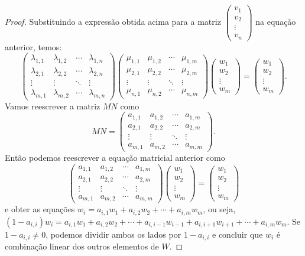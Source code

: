 \begin{proof}
	Substituindo a expressão obtida acima para a matriz $\begin{pmatrix}
	v_1\\v_2\\\vdots\\v_n
	\end{pmatrix}$ na equação anterior, temos:
	\[\begin{pmatrix}
	\lambda_{1,1}&\lambda_{1,2}&\cdots&\lambda_{1,n}\\
	\lambda_{2,1}&\lambda_{2,2}&\cdots&\lambda_{2,n}\\
	\vdots&\vdots&\ddots&\vdots\\
	\lambda_{m,1}&\lambda_{m,2}&\cdots&\lambda_{m,n}
	\end{pmatrix}\begin{pmatrix}
	\mu_{1,1}&\mu_{1,2}&\cdots&\mu_{1,m}\\
	\mu_{2,1}&\mu_{2,2}&\cdots&\mu_{2,m}\\
	\vdots&\vdots&\ddots&\vdots\\
	\mu_{n,1}&\mu_{n,2}&\cdots&\mu_{n,m}
	\end{pmatrix}\begin{pmatrix}
	w_1\\w_2\\\vdots\\w_m
	\end{pmatrix}=\begin{pmatrix}
	w_1\\w_2\\\vdots\\w_m
	\end{pmatrix}.\] Vamos reescrever a matriz $MN$ como
	\[MN=\begin{pmatrix}
	a_{1,1}&a_{1,2}&\cdots&a_{1,m}\\
	a_{2,1}&a_{2,2}&\cdots&a_{2,m}\\
	\vdots&\vdots&\ddots&\vdots\\
	a_{m,1}&a_{m,2}&\cdots&a_{m,m}
	\end{pmatrix}.\] Então podemos reescrever a equação matricial anterior como
	\[\begin{pmatrix}
	a_{1,1}&a_{1,2}&\cdots&a_{1,m}\\
	a_{2,1}&a_{2,2}&\cdots&a_{2,m}\\
	\vdots&\vdots&\ddots&\vdots\\
	a_{m,1}&a_{m,2}&\cdots&a_{m,m}
\end{pmatrix}\begin{pmatrix}
w_1\\w_2\\\vdots\\w_m
\end{pmatrix}=\begin{pmatrix}
w_1\\w_2\\\vdots\\w_m
\end{pmatrix}\]e obter as equações $w_i=a_{i,1}w_1+a_{i,2}w_2+\cdots+a_{i,m}w_m$, ou seja, $(1-a_{i,i})w_i=a_{i,1}w_1+a_{i,2}w_2+\cdots+a_{i,i-1}w_{i-1}+a_{i,i+1}w_{i+1}+\cdots+a_{i,m}w_m$. Se $1-a_{i,i}\neq 0$, podemos dividir ambos os lados por $1-a_{i,i}$ e concluir que $w_i$ é combinação linear dos outros elementos de $W$. 


\end{proof}
